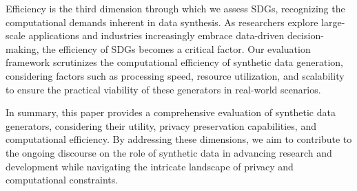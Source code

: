 \documentclass[runningheads]{llncs}
\begin{document}
Efficiency is the third dimension through which we assess SDGs, recognizing the computational demands inherent in data synthesis. As researchers explore large-scale applications and industries increasingly embrace data-driven decision-making, the efficiency of SDGs becomes a critical factor. Our evaluation framework scrutinizes the computational efficiency of synthetic data generation, considering factors such as processing speed, resource utilization, and scalability to ensure the practical viability of these generators in real-world scenarios.

In summary, this paper provides a comprehensive evaluation of synthetic data generators, considering their utility, privacy preservation capabilities, and computational efficiency. By addressing these dimensions, we aim to contribute to the ongoing discourse on the role of synthetic data in advancing research and development while navigating the intricate landscape of privacy and computational constraints.

\clearpage


\end{document}
